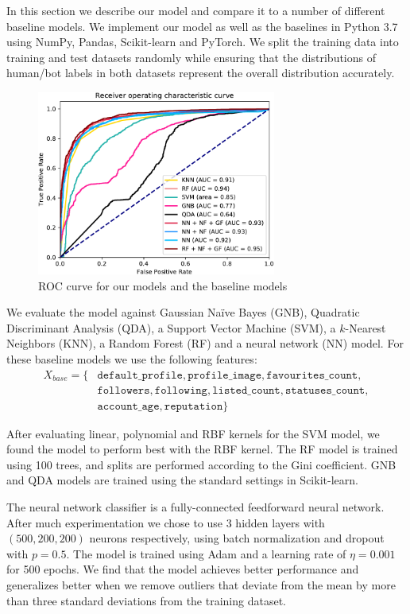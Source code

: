 In this section we describe our model and compare it to a number of different baseline models. We implement our model as well as the baselines in Python 3.7 using NumPy, Pandas, Scikit-learn and PyTorch. We split the training data into training and test datasets randomly while ensuring that the distributions of human/bot labels in both datasets represent the overall distribution accurately.

\begin{figure}
    \centering
    \includegraphics[width=0.7\textwidth]{FIG/roc-crop.pdf}
    \caption{ROC curve for our models and the baseline models}
    \label{fig:roc}
\end{figure}

We evaluate the model against Gaussian Naïve Bayes (GNB), Quadratic Discriminant Analysis (QDA), a Support Vector Machine (SVM), a $k$-Nearest Neighbors (KNN), a Random Forest (RF) and a neural network (NN) model. For these baseline models we use the following features:
\begin{align*}
    X_{base} = \{ & \texttt{default\_profile}, \texttt{profile\_image}, \texttt{favourites\_count}, \\
    & \texttt{followers}, \texttt{following}, \texttt{listed\_count}, \texttt{statuses\_count}, \\
    & \texttt{account\_age}, \texttt{reputation} \}
\end{align*}


After evaluating linear, polynomial and RBF kernels for the SVM model, we found the model to perform best with the RBF kernel. The RF model is trained using 100 trees, and splits are performed according to the Gini coefficient. GNB and QDA models are trained using the standard settings in Scikit-learn. 

The neural network classifier is a fully-connected feedforward neural network. After much experimentation we chose to use 3 hidden layers with $(500, 200, 200)$ neurons respectively, using batch normalization and dropout with $p=0.5$. The model is trained using Adam and a learning rate of $\eta = 0.001$ for 500 epochs. We find that the model achieves better performance and generalizes better when we remove outliers that deviate from the mean by more than three standard deviations from the training dataset.

